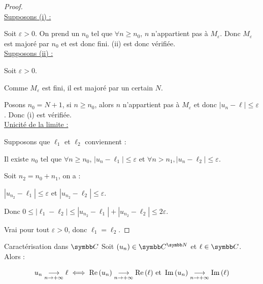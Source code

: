 \begin{proof}~\\
    \uline{Supposons (i) :}

    \vspace{0.2em}Soit $\varepsilon > 0$. On prend un $n_0$ tel que $\forall n \geqslant n_0$, $n$ n'appartient pas 
    à $M_\varepsilon$. Donc $M_\varepsilon$ est majoré par $n_0$ et est donc fini. (ii) est donc vérifiée.\\

    \uline{Supposons (ii) :}

    \vspace{0.2em}Soit $\varepsilon > 0$. 

    Comme $M_\varepsilon$ est fini, il est majoré par un certain $N$. 

    Posons $n_0 = N + 1$, si $n \geqslant n_0$, alors $n$ n'appartient pas à $M_\varepsilon$ et donc
    $|u_n - \ell| \leqslant \varepsilon$. Donc (i) est vérifiée.\\

    \uline{Unicité de la limite :}

    \vspace{0.2em} Supposons que $\ell_1$ et $\ell_2$ conviennent : 

    Il existe $n_0$ tel que $\forall n \geqslant n_0$, $|u_n - \ell_1| \leqslant \varepsilon$ et $\forall n > n_1, |u_n - \ell_2| \leqslant \varepsilon$.

    \vspace{0.2em} Soit $n_2 = n_0 + n_1$, on a :

    $|u_{n_2} - \ell_1| \leqslant \varepsilon$ et $|u_{n_2} - \ell_2| \leqslant \varepsilon$.

    Donc $0 \leqslant |\ell_1 - \ell_2| \leqslant |u_{n_2} - \ell_1| + |u_{n_2} - \ell_2| \leqslant 2\varepsilon$.

    Vrai pour tout $\varepsilon > 0$, donc $\ell_1 = \ell_2$.
\end{proof}


\begin{proposition}{Caractérisation dans $\C$}{}
    Soit $(u_n) \in \C^{\N}$ et $\ell \in \C$. Alors : 

    \[u_n \underset{n \to +\infty}{\longrightarrow} \ell \iff \operatorname{Re} \,(u_n) \underset{n \to +\infty}{\longrightarrow} \operatorname{Re} \,(\ell) \text{ et } \operatorname{Im} \,(u_n) \underset{n \to +\infty}{\longrightarrow} \operatorname{Im} \,(\ell)\]
\end{proposition}

